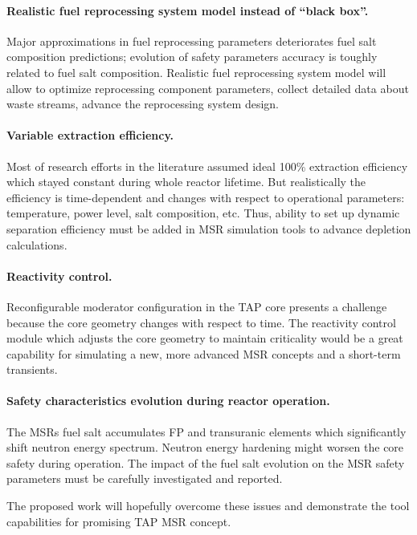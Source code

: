 \paragraph{Realistic fuel reprocessing system model instead of ``black box''.} 
Major approximations in fuel reprocessing parameters deteriorates fuel salt 
composition predictions; evolution of safety parameters accuracy is toughly 
related to fuel salt composition. Realistic fuel reprocessing system model 
will allow to optimize reprocessing component parameters, collect detailed 
data about waste streams, advance the reprocessing system design.
\paragraph{Variable extraction efficiency.} Most of research efforts in the 
literature assumed ideal 100\% extraction efficiency which stayed constant 
during whole reactor lifetime. But realistically the efficiency is 
time-dependent and changes with respect to operational parameters: 
temperature, power level, salt composition, etc. Thus, ability to set up 
dynamic separation efficiency must be added in \gls{MSR} simulation tools to 
advance depletion calculations.
\paragraph{Reactivity control.} Reconfigurable moderator configuration in the 
\gls{TAP} core presents a challenge because the core geometry changes with 
respect to time. The reactivity control module which adjusts the core geometry 
to maintain criticality would be a great capability for simulating a new, more 
advanced \gls{MSR} concepts and a short-term transients.
\paragraph{Safety characteristics evolution during reactor operation.} The 
\glspl{MSR} fuel salt  accumulates \gls{FP} and transuranic elements which 
significantly shift neutron energy spectrum. Neutron energy hardening might 
worsen the core safety during operation. The impact of the fuel salt evolution 
on the \gls{MSR} safety parameters must be carefully investigated and reported.

The proposed work will hopefully overcome these issues and demonstrate the 
tool capabilities for promising \gls{TAP} \gls{MSR} concept.